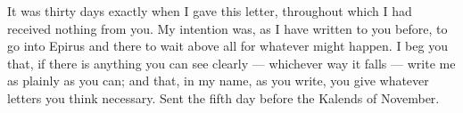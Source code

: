 

 It was thirty days exactly when I gave this letter, throughout which I had received nothing from you. My intention was, as I have written to you before, to go into Epirus and there to wait above all for whatever might happen. I beg you that, if there is anything you can see clearly --- whichever way it falls --- write me as plainly as you can; and that, in my name, as you write, you give whatever letters you think necessary. Sent the fifth day before the Kalends of November.
